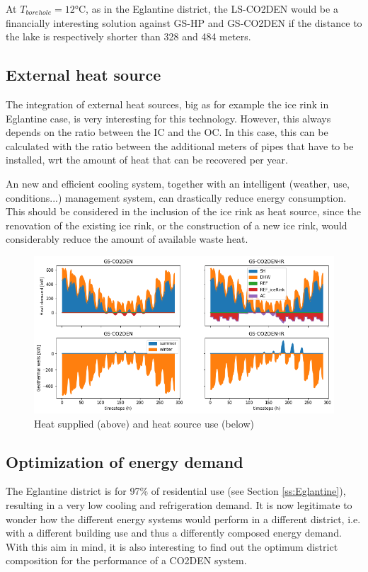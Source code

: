 \documentclass{article}
\begin{document}
At $T_{borehole} = 12 \si{\celsius}$, as in the Eglantine district, the LS-CO2DEN would be a financially interesting solution against  GS-HP and GS-CO2DEN if the distance to the lake is respectively shorter than 328 and 484 meters.


\subsection{External heat source}
The integration of external heat sources, big as for example the ice rink in Eglantine case, is very interesting for this technology. However, this always depends on the ratio between the IC and the OC. In this case, this can be calculated with the ratio between the additional meters of pipes that have to be installed, wrt the amount of heat that can be recovered per year.


An new and efficient cooling system, together with an intelligent (weather, use, conditions...) management system, can drastically reduce energy consumption. This should be considered in the inclusion of the ice rink as heat source, since the renovation of the existing ice rink, or the construction of a new ice rink, would considerably reduce the amount of available waste heat.

\begin{figure}[tph]
	\centering
	\includegraphics[width=1\linewidth]{Images/V_IR_Q}
	\caption{Heat supplied (above) and heat source use (below)}
	\label{fig:V_IR_Q}
\end{figure}

\subsection{Optimization of energy demand}
The Eglantine district is for 97\% of residential use (see Section \ref{ss:Eglantine}), resulting in a very low cooling and refrigeration demand. It is now legitimate to wonder how the different energy systems would perform in a different district, i.e. with a different building use and thus a differently composed energy demand. With this aim in mind, it is also interesting to find out the optimum district composition for the performance of a CO2DEN system.\\
\end{document}
